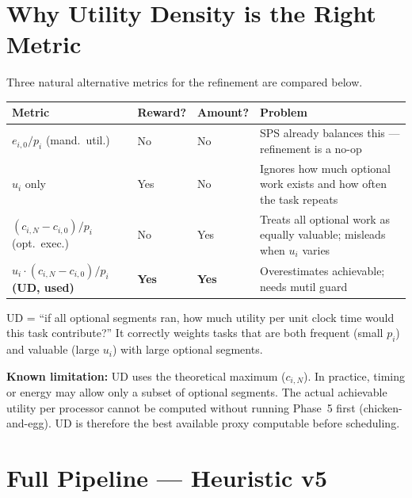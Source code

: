 \documentclass[10pt,twocolumn]{article}
\begin{document}
\section{Why Utility Density is the Right Metric}

Three natural alternative metrics for the refinement are compared below.

\begin{center}
\renewcommand{\arraystretch}{1.3}
\begin{tabular}{p{1.7cm}p{1.3cm}p{1.3cm}p{2.0cm}}
\toprule
\textbf{Metric} &
\textbf{Reward?} &
\textbf{Amount?} &
\textbf{Problem} \\
\midrule
$e_{i,0}/p_i$ \newline (mand.\ util.) &
No & No &
SPS already balances this --- refinement is a no-op \\
\midrule
$u_i$ only &
Yes & No &
Ignores how much optional work exists and how often the task repeats \\
\midrule
$(c_{i,N} - c_{i,0})/p_i$ \newline (opt.\ exec.) &
No & Yes &
Treats all optional work as equally valuable; misleads when $u_i$ varies \\
\midrule
$u_i\!\cdot\!(c_{i,N}-c_{i,0})/p_i$ \newline \textbf{(UD, used)} &
\textbf{Yes} & \textbf{Yes} &
Overestimates achievable; needs mutil guard \\
\bottomrule
\end{tabular}
\end{center}

UD = ``if all optional segments ran, how much utility per unit clock time
would this task contribute?'' It correctly weights tasks that are both
frequent (small $p_i$) and valuable (large $u_i$) with large optional
segments.

\textbf{Known limitation:} UD uses the theoretical maximum ($c_{i,N}$).
In practice, timing or energy may allow only a subset of optional segments.
The actual achievable utility per processor cannot be computed without
running Phase~5 first (chicken-and-egg). UD is therefore the best available
proxy computable before scheduling.

\section{Full Pipeline --- Heuristic v5}
\end{document}
